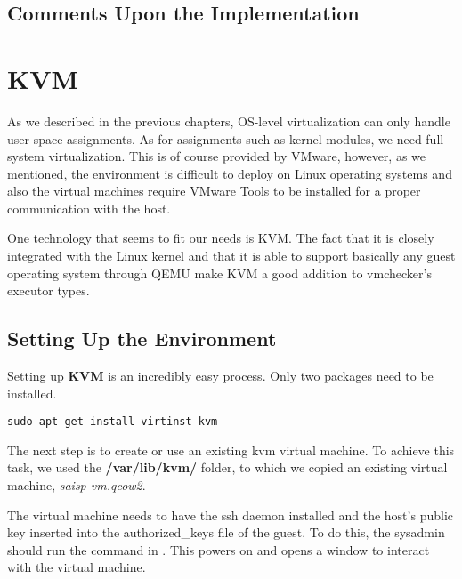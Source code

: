 \subsection{Comments Upon the Implementation}
\label{sec:vmc-lxc-comments}


\section{KVM}
\label{sec:vmc-kvm}

As we described in the previous chapters, OS-level virtualization can only
handle user space assignments. As for assignments such as kernel modules,
we need full system virtualization. This is of course provided by VMware,
however, as we mentioned, the environment is difficult to deploy on 
Linux operating systems and also the virtual machines require VMware Tools
to be installed for a proper communication with the host.

One technology that seems to fit our needs is KVM. The fact that it is closely
integrated with the Linux kernel and that it is able to support basically
any guest operating system through QEMU make KVM a good addition to vmchecker's 
executor types.

\subsection{Setting Up the Environment}
\label{sub-sec:vmc-kvm-setup}

Setting up \textbf{KVM} is an incredibly easy process. Only two packages need
to be installed.

\lstset{caption=Install the Needed Packages, label=lst:kvm-deps}
\begin{lstlisting}
sudo apt-get install virtinst kvm
\end{lstlisting}

The next step is to create or use an existing kvm virtual machine.
To achieve this task, we used the \textbf{/var/lib/kvm/} folder, to which
we copied an existing virtual machine, \textit{saisp-vm.qcow2}.

The virtual machine needs to have the ssh daemon installed and the host's
public key inserted into the authorized_keys file of the guest. To do this,
the sysadmin should run the command in .
This powers on and opens a window to interact with the virtual machine.

